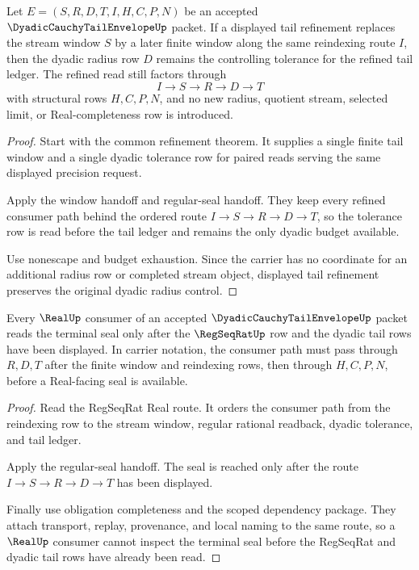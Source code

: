 \begin{theorem}
\label{thm:dyadic-cauchy-tail-envelope-radius-stability}
Let $E=(S,R,D,T,I,H,C,P,N)$ be an accepted $\DyadicCauchyTailEnvelopeUp$ packet. If a displayed tail refinement replaces the stream window $S$ by a later finite window along the same reindexing route $I$, then the dyadic radius row $D$ remains the controlling tolerance for the refined tail ledger. The refined read still factors through
$$
I \longrightarrow S \longrightarrow R \longrightarrow D \longrightarrow T
$$
with structural rows $H,C,P,N$, and no new radius, quotient stream, selected limit, or Real-completeness row is introduced.
\end{theorem}
\begin{proof}
Start with the common refinement theorem. It supplies a single finite tail window and a single dyadic tolerance row for paired reads serving the same displayed precision request.

Apply the window handoff and regular-seal handoff. They keep every refined consumer path behind the ordered route $I \longrightarrow S \longrightarrow R \longrightarrow D \longrightarrow T$, so the tolerance row is read before the tail ledger and remains the only dyadic budget available.

Use nonescape and budget exhaustion. Since the carrier has no coordinate for an additional radius row or completed stream object, displayed tail refinement preserves the original dyadic radius control.
\end{proof}

\begin{theorem}
\label{thm:dyadic-cauchy-tail-envelope-real-seal-handoff}
Every $\RealUp$ consumer of an accepted $\DyadicCauchyTailEnvelopeUp$ packet reads the terminal seal only after the $\RegSeqRatUp$ row and the dyadic tail rows have been displayed. In carrier notation, the consumer path must pass through $R,D,T$ after the finite window and reindexing rows, then through $H,C,P,N$, before a Real-facing seal is available.
\end{theorem}
\begin{proof}
Read the RegSeqRat Real route. It orders the consumer path from the reindexing row to the stream window, regular rational readback, dyadic tolerance, and tail ledger.

Apply the regular-seal handoff. The seal is reached only after the route $I \longrightarrow S \longrightarrow R \longrightarrow D \longrightarrow T$ has been displayed.

Finally use obligation completeness and the scoped dependency package. They attach transport, replay, provenance, and local naming to the same route, so a $\RealUp$ consumer cannot inspect the terminal seal before the RegSeqRat and dyadic tail rows have already been read.
\end{proof}

